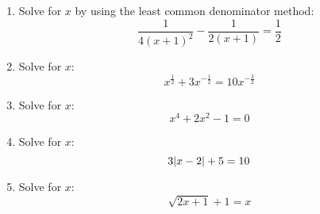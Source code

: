\documentclass[letterpaper,12pt,fleqn]{article}
\begin{document}
\begin{enumerate}
  \vspace{3.5in}

\item Solve for $x$ by using the least common denominator method:
  \[\frac{1}{4(x+1)^2}-\frac{1}{2(x+1)}=\frac{1}{2}\]

  \newpage

\item Solve for $x$:
  \[x^{\frac{1}{2}}+3x^{-\frac{1}{2}}=10x^{-\frac{3}{2}}\]

  \vspace{3.5in}

\item Solve for $x$:
  \[x^4+2x^2-1=0\]

  \newpage

\item Solve for $x$:
  \[3\lvert x-2\rvert+5=10\]

  \vspace{3.5in}

\item Solve for $x$:
  \[\sqrt{2x+1}+1=x\]

\end{enumerate}
\end{document}
